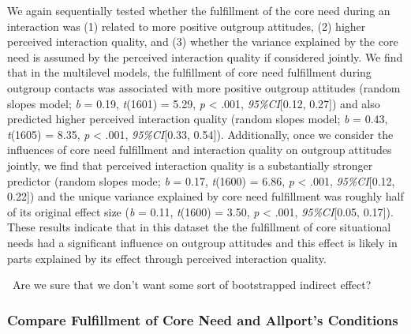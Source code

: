 \documentclass[man, 12pt, a4paper]{apa7}
\theoremstyle{break}
\theoremstyle{plain}
\begin{document}
We again sequentially tested whether the fulfillment of the core need
during an interaction was (1) related to more positive outgroup
attitudes, (2) higher perceived interaction quality, and (3) whether the
variance explained by the core need is assumed by the perceived
interaction quality if considered jointly. We find that in the
multilevel models, the fulfillment of core need fulfillment during
outgroup contacts was associated with more positive outgroup attitudes
(random slopes model; \textit{b} = 0.19, \textit{t}(1601) = 5.29,
\textit{p} \textless{} .001, \textit{95\%CI}{[}0.12, 0.27{]}) and also
predicted higher perceived interaction quality (random slopes model;
\textit{b} = 0.43, \textit{t}(1605) = 8.35, \textit{p} \textless{} .001,
\textit{95\%CI}{[}0.33, 0.54{]}). Additionally, once we consider the
influences of core need fulfillment and interaction quality on outgroup
attitudes jointly, we find that perceived interaction quality is a
substantially stronger predictor (random slopes mode; \textit{b} = 0.17,
\textit{t}(1600) = 6.86, \textit{p} \textless{} .001,
\textit{95\%CI}{[}0.12, 0.22{]}) and the unique variance explained by
core need fulfillment was roughly half of its original effect size
(\textit{b} = 0.11, \textit{t}(1600) = 3.50, \textit{p} \textless{}
.001, \textit{95\%CI}{[}0.05, 0.17{]}). These results indicate that in
this dataset the the fulfillment of core situational needs had a
significant influence on outgroup attitudes and this effect is likely in
parts explained by its effect through perceived interaction quality.

\faQuestionCircle~Are we sure that we don't want some sort of
bootstrapped indirect effect?

\subsubsection{Compare Fulfillment of Core Need and Allport's Conditions}
\end{document}
